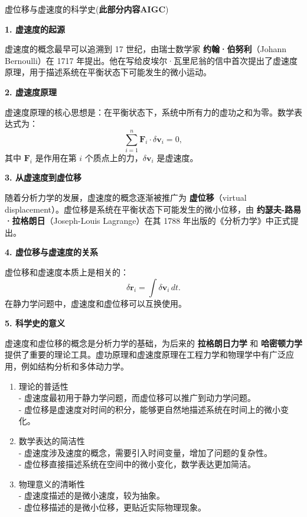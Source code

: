 \documentclass[12pt, a4paper, oneside, UTF8]{ctexbook}  %
\begin{document}
\begin{add}
虚位移与虚速度的科学史(\textbf{此部分内容AIGC})

\noindent \textbf{1. 虚速度的起源} 

虚速度的概念最早可以追溯到 17 世纪，由瑞士数学家 \textbf{约翰·伯努利}（Johann Bernoulli）在 1717 年提出。他在写给皮埃尔·瓦里尼翁的信中首次提出了虚速度原理，用于描述系统在平衡状态下可能发生的微小运动。

\noindent \textbf{2. 虚速度原理} 

虚速度原理的核心思想是：在平衡状态下，系统中所有力的虚功之和为零。数学表达式为：
\[
\sum_{i=1}^n \mathbf{F}_i \cdot \delta \mathbf{v}_i = 0,
\]
其中 \( \mathbf{F}_i \) 是作用在第 \( i \) 个质点上的力，\( \delta \mathbf{v}_i \) 是虚速度。

\noindent \textbf{3. 从虚速度到虚位移} 

随着分析力学的发展，虚速度的概念逐渐被推广为 \textbf{虚位移}（virtual displacement）。虚位移是系统在平衡状态下可能发生的微小位移，由 \textbf{约瑟夫-路易·拉格朗日}（Joseph-Louis Lagrange）在其 1788 年出版的《分析力学》中正式提出。

\noindent \textbf{4. 虚位移与虚速度的关系} 

虚位移和虚速度本质上是相关的：
\[
\delta \mathbf{r}_i = \int \delta \mathbf{v}_i \, dt.
\]
在静力学问题中，虚速度和虚位移可以互换使用。

\noindent \textbf{5. 科学史的意义} 

虚速度和虚位移的概念是分析力学的基础，为后来的 \textbf{拉格朗日力学} 和 \textbf{哈密顿力学} 提供了重要的理论工具。虚功原理和虚速度原理在工程力学和物理学中有广泛应用，例如结构分析和多体动力学。

\begin{enumerate}
\item 理论的普适性 \\
- 虚速度最初用于静力学问题，而虚位移可以推广到动力学问题。 \\
- 虚位移是虚速度对时间的积分，能够更自然地描述系统在时间上的微小变化。

\item 数学表达的简洁性 \\
- 虚速度涉及速度的概念，需要引入时间变量，增加了问题的复杂性。 \\
- 虚位移直接描述系统在空间中的微小变化，数学表达更加简洁。

\item 物理意义的清晰性 \\
- 虚速度描述的是微小速度，较为抽象。 \\
- 虚位移描述的是微小位移，更贴近实际物理现象。
\end{enumerate}
\end{add}
\end{document}
